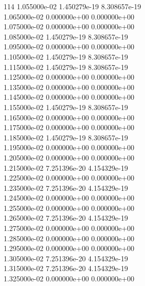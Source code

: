 114	1.055000e-02	1.450279e-19	8.308657e-19	\\ 	1.065000e-02	0.000000e+00	0.000000e+00	\\ 	1.075000e-02	0.000000e+00	0.000000e+00	\\ 	1.085000e-02	1.450279e-19	8.308657e-19	\\ 	1.095000e-02	0.000000e+00	0.000000e+00	\\ 	1.105000e-02	1.450279e-19	8.308657e-19	\\ 	1.115000e-02	1.450279e-19	8.308657e-19	\\ 	1.125000e-02	0.000000e+00	0.000000e+00	\\ 	1.135000e-02	0.000000e+00	0.000000e+00	\\ 	1.145000e-02	0.000000e+00	0.000000e+00	\\ 	1.155000e-02	1.450279e-19	8.308657e-19	\\ 	1.165000e-02	0.000000e+00	0.000000e+00	\\ 	1.175000e-02	0.000000e+00	0.000000e+00	\\ 	1.185000e-02	1.450279e-19	8.308657e-19	\\ 	1.195000e-02	0.000000e+00	0.000000e+00	\\ 	1.205000e-02	0.000000e+00	0.000000e+00	\\ 	1.215000e-02	7.251396e-20	4.154329e-19	\\ 	1.225000e-02	0.000000e+00	0.000000e+00	\\ 	1.235000e-02	7.251396e-20	4.154329e-19	\\ 	1.245000e-02	0.000000e+00	0.000000e+00	\\ 	1.255000e-02	0.000000e+00	0.000000e+00	\\ 	1.265000e-02	7.251396e-20	4.154329e-19	\\ 	1.275000e-02	0.000000e+00	0.000000e+00	\\ 	1.285000e-02	0.000000e+00	0.000000e+00	\\ 	1.295000e-02	0.000000e+00	0.000000e+00	\\ 	1.305000e-02	7.251396e-20	4.154329e-19	\\ 	1.315000e-02	7.251396e-20	4.154329e-19	\\ 	1.325000e-02	0.000000e+00	0.000000e+00	\\ \hline
